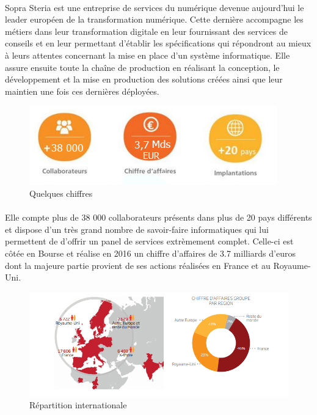 \paragraph{}
Sopra Steria est une entreprise de services du numérique devenue aujourd'hui le leader européen de la transformation numérique. Cette dernière accompagne les métiers dans leur transformation digitale en leur fournissant des services de conseils et en leur permettant d'établir les spécifications qui répondront au mieux à leurs attentes concernant la mise en place d'un système informatique. Elle assure ensuite toute la chaîne de production en réalisant la conception, le développement et la mise en production des solutions créées ainsi que leur maintien une fois ces dernières déployées.

\begin{figure}[h]
	\includegraphics[scale=1]{images/entreprise/sopraSteriaChiffres.png}
	\centering
	\caption{Quelques chiffres}
	\label{sopraSteriaChiffres}
\end{figure}

\paragraph{}
Elle compte plus de 38 000 collaborateurs présents dans plus de 20 pays différents et dispose d'un très grand nombre de savoir-faire informatiques qui lui permettent de d'offrir un panel de services extrèmement complet. Celle-ci est côtée en Bourse et réalise en 2016 un chiffre d'affaires de 3.7 milliards d'euros dont la majeure partie provient de ses actions réalisées en France et au Royaume-Uni.

\begin{figure}[h]
	\includegraphics[scale=0.9]{images/entreprise/sopraSteriaMonde.png}
	\centering
	\caption{Répartition internationale}
	\label{sopraSteriaMonde}
\end{figure}
		
		